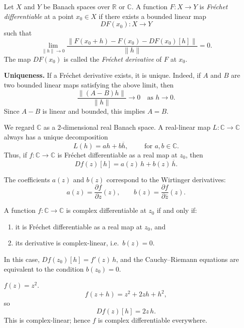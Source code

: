 \smallskip

Let $X$ and $Y$ be Banach spaces over $\mathbb{R}$ or $\mathbb{C}$.  
A function $F : X \to Y$ is \emph{Fréchet differentiable} at a point $x_0 \in X$ if there exists a bounded linear map
\[
DF(x_0) : X \to Y 
\]
such that
\[
\lim_{\|h\|\to 0} \frac{\|F(x_0+h)-F(x_0)-DF(x_0)[h]\|}{\|h\|} = 0.
\]
The map $DF(x_0)$ is called the \emph{Fréchet derivative} of $F$ at $x_0$.

\medskip

\noindent
\textbf{Uniqueness.}
If a Fréchet derivative exists, it is unique.  
Indeed, if $A$ and $B$ are two bounded linear maps satisfying the above limit, then
\[
\frac{\|(A-B)h\|}{\|h\|} \to 0 \quad \text{as } h \to 0.
\]
Since $A-B$ is linear and bounded, this implies $A=B$.

We regard $\mathbb{C}$ as a $2$-dimensional real Banach space.  
A real-linear map $L : \mathbb{C} \to \mathbb{C}$ always has a unique decomposition
\[
L(h) = a h + b \overline{h}, \qquad \text{ for } a,b \in \mathbb{C}.
\]
Thus, if $f : \mathbb{C} \to \mathbb{C}$ is Fr\'echet differentiable as a real map at $z_0$, then
\[
Df(z)[h] = a(z)\, h + b(z)\, \overline{h}.
\]

The coefficients $a(z)$ and $b(z)$ correspond to the Wirtinger derivatives:
\[
a(z) = \frac{\partial f}{\partial z}(z), \qquad
b(z) = \frac{\partial f}{\partial \overline{z}}(z).
\]

A function $f : \mathbb{C} \to \mathbb{C}$ is complex differentiable at $z_0$ if and only if:

\begin{enumerate}
	\item it is Fr\'echet differentiable as a real map at $z_0$, and
	\item its derivative is complex-linear, i.e.\ $b(z)=0$.
\end{enumerate}

In this case,
$Df(z_0)[h] = f'(z)\, h$,
and the Cauchy--Riemann equations are equivalent to the condition $b(z_0)=0$.

\begin{example}
$f(z)=z^2$.
\[
f(z+h) = z^2 + 2zh + h^2,
\]
so
\[
Df(z)[h] = 2z\,h.
\]
This is complex-linear; hence $f$ is complex differentiable everywhere.
\end{example}


